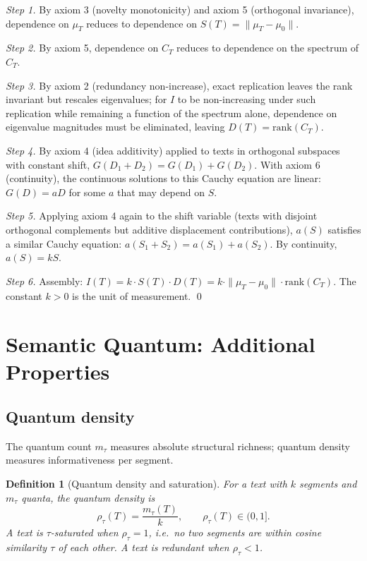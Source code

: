 \documentclass[11pt]{article}
\newtheorem{definition}{Definition}
\begin{document}
\noindent\emph{Step 1.} By axiom 3 (novelty monotonicity) and axiom 5 (orthogonal invariance), dependence on $\mu_T$ reduces to dependence on $S(T) = \|\mu_T - \mu_0\|$.

\noindent\emph{Step 2.} By axiom 5, dependence on $C_T$ reduces to dependence on the spectrum of $C_T$.

\noindent\emph{Step 3.} By axiom 2 (redundancy non-increase), exact replication leaves the rank invariant but rescales eigenvalues; for $I$ to be non-increasing under such replication while remaining a function of the spectrum alone, dependence on eigenvalue magnitudes must be eliminated, leaving $D(T) = \mathrm{rank}(C_T)$.

\noindent\emph{Step 4.} By axiom 4 (idea additivity) applied to texts in orthogonal subspaces with constant shift, $G(D_1 + D_2) = G(D_1) + G(D_2)$. With axiom 6 (continuity), the continuous solutions to this Cauchy equation are linear: $G(D) = aD$ for some $a$ that may depend on $S$.

\noindent\emph{Step 5.} Applying axiom 4 again to the shift variable (texts with disjoint orthogonal complements but additive displacement contributions), $a(S)$ satisfies a similar Cauchy equation: $a(S_1 + S_2) = a(S_1) + a(S_2)$. By continuity, $a(S) = kS$.

\noindent\emph{Step 6.} Assembly: $I(T) = k \cdot S(T) \cdot D(T) = k \cdot \|\mu_T - \mu_0\| \cdot \mathrm{rank}(C_T)$. The constant $k > 0$ is the unit of measurement. \qed

\section{Semantic Quantum: Additional Properties}\label{app:quantum}

\subsection{Quantum density}

The quantum count $m_\tau$ measures absolute structural richness; quantum density measures informativeness per segment.

\begin{definition}[Quantum density and saturation]
For a text with $k$ segments and $m_\tau$ quanta, the \emph{quantum density} is
\[
\rho_\tau(T) = \frac{m_\tau(T)}{k}, \qquad \rho_\tau(T) \in (0, 1].
\]
A text is \emph{$\tau$-saturated} when $\rho_\tau = 1$, i.e.\ no two segments are within cosine similarity $\tau$ of each other. A text is \emph{redundant} when $\rho_\tau < 1$.
\end{definition}
\end{document}
